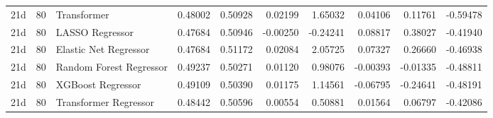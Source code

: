 \begin{tabular}{lllrrrrrrr}
21d & 80 & Transformer & 0.48002 & 0.50928 & 0.02199 & 1.65032 & 0.04106 & 0.11761 & -0.59478 \\
21d & 80 & LASSO Regressor & 0.47684 & 0.50946 & -0.00250 & -0.24241 & 0.08817 & 0.38027 & -0.41940 \\
21d & 80 & Elastic Net Regressor & 0.47684 & 0.51172 & 0.02084 & 2.05725 & 0.07327 & 0.26660 & -0.46938 \\
21d & 80 & Random Forest Regressor & 0.49237 & 0.50271 & 0.01120 & 0.98076 & -0.00393 & -0.01335 & -0.48811 \\
21d & 80 & XGBoost Regressor & 0.49109 & 0.50390 & 0.01175 & 1.14561 & -0.06795 & -0.24641 & -0.48191 \\
21d & 80 & Transformer Regressor & 0.48442 & 0.50596 & 0.00554 & 0.50881 & 0.01564 & 0.06797 & -0.42086 \\
\bottomrule
\end{tabular}
